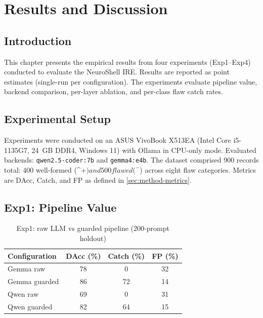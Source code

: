 ﻿\chapter{Results and Discussion}\label{ch:results}

\section{Introduction}\label{sec:results-intro}

This chapter presents the empirical results from four experiments (Exp1--Exp4) conducted to evaluate the NeuroShell IRE. Results are reported as point estimates (single-run per configuration). The experiments evaluate pipeline value, backend comparison, per-layer ablation, and per-class flaw catch rates.

\section{Experimental Setup}\label{sec:results-setup}

Experiments were conducted on an ASUS VivoBook X513EA (Intel Core i5-1135G7, 24~GB DDR4, Windows 11) with Ollama in CPU-only mode. Evaluated backends: \texttt{qwen2.5-coder:7b} and \texttt{gemma4:e4b}. The dataset comprised 900 records total: 400 well-formed (^+$) and 500 flawed (^-$) across eight flaw categories. Metrics are DAcc, Catch, and FP as defined in \cref{sec:method-metrics}.

\section{Exp1: Pipeline Value}\label{sec:results-exp1}

\begin{table}[htbp]
  \centering
  \caption{Exp1: raw LLM vs guarded pipeline (200-prompt holdout)}
  \label{tab:exp1}
  \sliittablestyle
  \begin{tabular}{lccc}
    \toprule
    \textbf{Configuration} & \textbf{DAcc (\%)} & \textbf{Catch (\%)} & \textbf{FP (\%)} \\
    \midrule
    Gemma raw & 78 & 0 & 32 \\
    Gemma guarded & 86 & 72 & 14 \\
    Qwen raw & 69 & 0 & 31 \\
    Qwen guarded & 82 & 64 & 15 \\
    \bottomrule
  \end{tabular}
\end{table}

